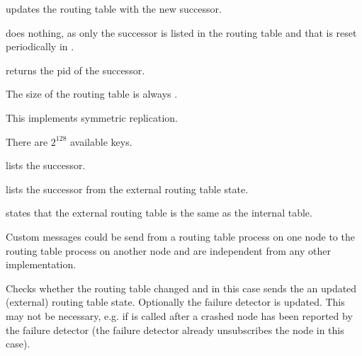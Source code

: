  updates the routing table with the new successor.

 does nothing, as only the successor is listed in
the routing table and that is reset periodically in .

 returns the pid of the successor.

The size of the routing table is always .

This  implements symmetric replication.

There are $2^{128}$ available keys.

 lists the successor.

 lists the successor from the external routing table state.

 states that the external routing table is the
same as the internal table.

Custom messages could be send from a routing table process on one node to the
routing table process on another node and are independent from any other
implementation.

Checks whether the routing table changed and in this case sends the
 an updated (external) routing table state. Optionally
the failure detector is updated. This may not be necessary, e.g. if
 is called after a crashed node has been reported by the failure
detector (the failure detector already unsubscribes the node in this case).

